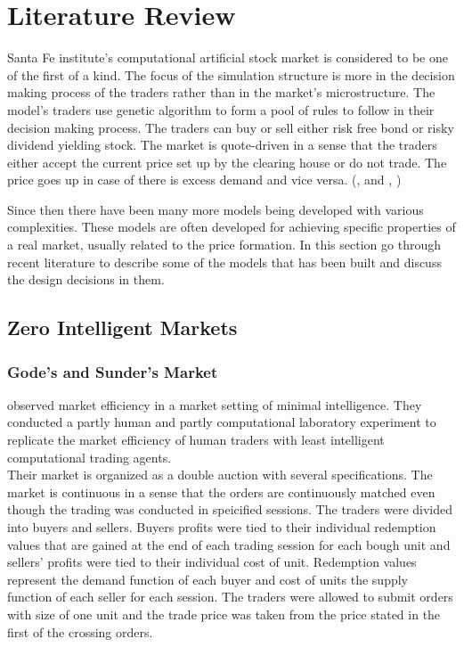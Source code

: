 \section{Literature Review}

Santa Fe institute's computational artificial stock 
market is considered to be one of the first of a kind. 
The focus of the simulation structure is more in the 
decision making process of the traders rather than in the 
market's microstructure. The model's traders use 
genetic algorithm to form a pool of rules to follow
in their decision making process. The traders can buy or
sell either risk free bond or risky dividend yielding stock.
The market is quote-driven in a sense that the traders
either accept the current price set up by the clearing house
or do not trade. The price goes up in case of there is excess
demand and vice versa. (\citeauthor{SantaFe94}, \citeyear{SantaFe94} 
and \citeauthor{SantaFe99}, \citeyear{SantaFe99})

Since then there have been many more models being 
developed with various complexities. These models are often developed
for achieving specific properties of a real market, 
usually related to the price formation. In this section
go through recent literature to describe some of the models
that has been built and discuss the design decisions in them.


\citep{Ben12}

\subsection{Zero Intelligent Markets}

\subsubsection{Gode's and Sunder's Market}
\citet{God93} observed market efficiency in a market setting
of minimal intelligence. They conducted a partly human and partly
computational laboratory experiment to replicate the market
efficiency of human traders with least intelligent computational
trading agents. \\

Their market is organized as a double auction with several
specifications. The market is continuous in a sense that the 
orders are continuously matched even though the trading was
conducted in speicified sessions. The traders were divided 
into buyers and sellers. Buyers profits were tied to their 
individual redemption values that are gained at the end of
each trading session for each bough unit and sellers' profits
were tied to their individual cost of unit. Redemption values
represent the demand function of each buyer and cost of units 
the supply function of each seller for each session. The
traders were allowed to submit orders with size of one unit
and the trade price was taken from the price stated in the 
first of the crossing orders. \\

